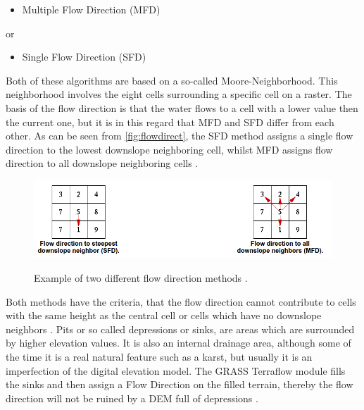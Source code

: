 \begin{itemize}
\item Multiple Flow Direction (MFD) 
\end{itemize}
or 
\begin{itemize}
\item Single Flow Direction (SFD)
\end{itemize}
 
Both of these algorithms are based on a so-called Moore-Neighborhood. This neighborhood involves the eight cells surrounding a specific cell on a raster. The basis of the flow direction is that the water flows to a cell with a lower value then the current one, but it is in this regard that MFD and SFD differ from each other. As can be seen from \autoref{fig:flowdirect}, the SFD method assigns a single flow direction to the lowest downslope neighboring cell, whilst MFD assigns flow direction to all downslope neighboring cells \citep{grassbook}. \\
\begin{figure}[t]
\centering
	{\includegraphics[width=\linewidth]{gfx/SFD_MFD.png}}
\caption{Example of two different flow direction methods \citep{sfdmfd}.}
\label{fig:flowdirect}
\end{figure}
Both methods have the criteria, that the flow direction cannot contribute to cells with the same height as the central cell or cells which have no downslope neighbors \citep{sfdmfd2}.
Pits or so called depressions or sinks, are areas which are surrounded by higher elevation values. It is also an internal drainage area, although some of the time it is a real natural feature such as a karst, but usually it is an imperfection of the digital elevation model.  The GRASS Terraflow module fills the sinks and then assign a Flow Direction on the filled terrain, thereby the flow direction will not be ruined by a DEM full of depressions \citep{sfdmfd}. 

